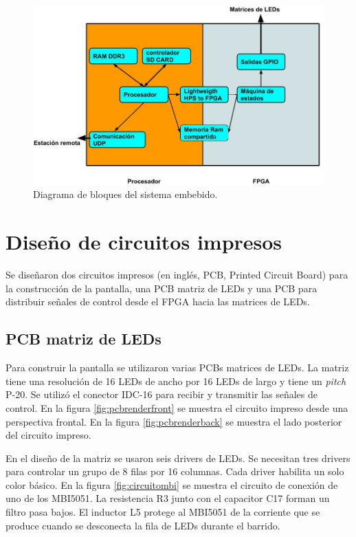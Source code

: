 \begin{figure}[htpb]
	\centering
	\includegraphics[scale=1.8]{Figures/Diagramabloques.jpg} 
	\caption{Diagrama de bloques del sistema embebido.}
	\label{fig:bloques embebido}
\end{figure}






\section{ Diseño de circuitos impresos}
Se diseñaron dos circuitos impresos (en inglés, PCB, Printed Circuit Board) para la construcción de la pantalla, una PCB matriz de LEDs y una PCB para distribuir señales de control desde el FPGA hacia las matrices de LEDs.
\subsection{PCB matriz de LEDs}
Para construir la pantalla se utilizaron varias PCBs matrices de LEDs. La matriz  tiene una resolución de 16 LEDs de ancho por 16 LEDs de largo y tiene un \textit{pitch} P-20. Se utilizó el conector IDC-16 para recibir y transmitir las señales de control. En la figura \ref{fig:pcbrenderfront}  se muestra el circuito impreso desde una perspectiva frontal. En la figura \ref{fig:pcbrenderback} se muestra el lado posterior del circuito impreso.

En el diseño de la matriz se usaron seis drivers de LEDs. Se necesitan tres drivers para controlar un grupo de 8 filas por 16 columnas. Cada driver habilita un solo color básico. En la figura \ref{fig:circuitombi} se muestra el circuito de conexión de uno de los MBI5051. La resistencia R3 junto con el capacitor C17 forman un filtro pasa bajos. El inductor L5 protege al MBI5051 de la corriente que se produce cuando se desconecta la fila de LEDs durante el barrido.

